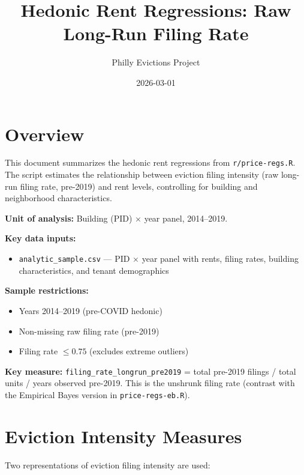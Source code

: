 \documentclass[
  11pt,
]{article}
\title{Hedonic Rent Regressions: Raw Long-Run Filing Rate}
\author{Philly Evictions Project}
\date{2026-03-01}
\providecommand{\tightlist}{%
  \setlength{\itemsep}{0pt}\setlength{\parskip}{0pt}}
\renewcommand*\contentsname{Table of contents}
\newcommand\contentsname{Table of contents}
\begin{document}
\maketitle

\renewcommand*\contentsname{Table of contents}
{
\hypersetup{linkcolor=}
\setcounter{tocdepth}{3}
\tableofcontents
}

\section{Overview}\label{overview}

This document summarizes the hedonic rent regressions from
\texttt{r/price-regs.R}. The script estimates the relationship between
eviction filing intensity (raw long-run filing rate, pre-2019) and rent
levels, controlling for building and neighborhood characteristics.

\textbf{Unit of analysis:} Building (PID) \(\times\) year panel,
2014--2019.

\textbf{Key data inputs:}

\begin{itemize}
\tightlist
\item
  \texttt{analytic\_sample.csv} --- PID \(\times\) year panel with
  rents, filing rates, building characteristics, and tenant demographics
\end{itemize}

\textbf{Sample restrictions:}

\begin{itemize}
\tightlist
\item
  Years 2014--2019 (pre-COVID hedonic)
\item
  Non-missing raw filing rate (pre-2019)
\item
  Filing rate \(\leq 0.75\) (excludes extreme outliers)
\end{itemize}

\textbf{Key measure:} \texttt{filing\_rate\_longrun\_pre2019} = total
pre-2019 filings / total units / years observed pre-2019. This is the
unshrunk filing rate (contrast with the Empirical Bayes version in
\texttt{price-regs-eb.R}).

\section{Eviction Intensity Measures}\label{eviction-intensity-measures}

Two representations of eviction filing intensity are used:
\end{document}
